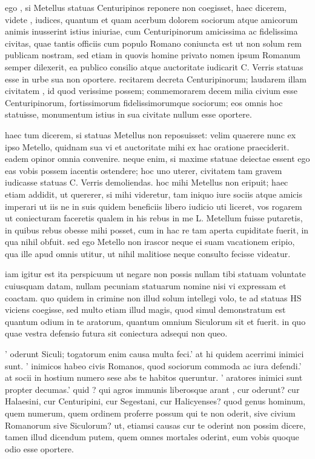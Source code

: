  ego , si Metellus statuas Centuripinos reponere non coegisset, haec dicerem, videte , iudices, quantum et quam acerbum dolorem sociorum atque amicorum animis inusserint istius iniuriae, cum Centuripinorum amicissima ac fidelissima civitas, quae tantis officiis cum populo Romano coniuncta est ut non solum rem publicam nostram, sed etiam in quovis homine privato nomen ipsum Romanum semper dilexerit, ea publico consilio atque auctoritate iudicarit C. Verris statuas esse in urbe sua non oportere. recitarem decreta Centuripinorum; laudarem illam civitatem , id quod verissime possem; commemorarem decem milia civium esse Centuripinorum, fortissimorum fidelissimorumque sociorum; eos omnis hoc statuisse, monumentum istius in sua civitate nullum esse oportere.

 haec tum dicerem, si statuas Metellus non reposuisset: velim quaerere nunc ex ipso Metello, quidnam sua vi et auctoritate mihi ex hac oratione praeciderit. eadem opinor omnia convenire. neque enim, si maxime statuae deiectae essent ego eas vobis possem iacentis ostendere; hoc uno uterer, civitatem tam gravem iudicasse statuas C. Verris demoliendas. hoc mihi Metellus non eripuit; haec etiam addidit, ut quererer, si mihi videretur, tam iniquo iure sociis atque amicis imperari ut iis ne in suis quidem beneficiis libero iudicio uti liceret, vos rogarem ut coniecturam faceretis qualem in his rebus in me L. Metellum fuisse putaretis, in quibus rebus obesse mihi posset, cum in hac re tam aperta cupiditate fuerit, in qua nihil obfuit. sed ego Metello non irascor neque ei suam vacationem eripio, qua ille apud omnis utitur, ut nihil malitiose neque consulto fecisse videatur.

 iam igitur est ita perspicuum ut negare non possis nullam tibi statuam voluntate cuiusquam datam, nullam pecuniam statuarum nomine nisi vi expressam et coactam. quo quidem in crimine non illud solum intellegi volo, te ad statuas HS viciens coegisse, sed multo etiam illud magis, quod simul demonstratum est quantum odium in te aratorum, quantum omnium Siculorum sit et fuerit. in quo quae vestra defensio futura sit coniectura adsequi non queo.

 ' oderunt Siculi; togatorum enim causa multa feci.' at hi quidem acerrimi inimici sunt. ' inimicos habeo civis Romanos, quod sociorum commoda ac iura defendi.' at socii in hostium numero sese abs te habitos queruntur. ' aratores inimici sunt propter decumas.' quid ? qui agros immunis liberosque arant , cur oderunt? cur Halaesini, cur Centuripini, cur Segestani, cur Halicyenses? quod genus hominum, quem numerum, quem ordinem proferre possum qui te non oderit, sive civium Romanorum sive Siculorum? ut, etiamsi causas cur te oderint non possim dicere, tamen illud dicendum putem, quem omnes mortales oderint, eum vobis quoque odio esse oportere.

